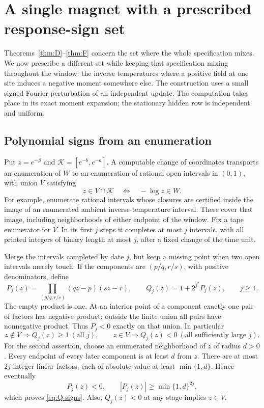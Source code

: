 \section{A single magnet with a prescribed response-sign set}\label{sec:response}

Theorems~\ref{thm:D}--\ref{thm:F} concern the set where the whole specification mixes. We now prescribe a different set while keeping that specification mixing throughout the window: the inverse temperatures where a positive field at one site induces a negative moment somewhere else. The construction uses a small signed Fourier perturbation of an independent update. The computation takes place in its exact moment expansion; the stationary hidden row is independent and uniform.

\subsection{Polynomial signs from an enumeration}\label{sec:sign-polynomials}

Put \(z=e^{-\beta}\) and \(\mathcal K=[e^{-b},e^{-a}]\). A computable change of coordinates transports an enumeration of \(W\) to an enumeration of rational open intervals in \((0,1)\), with union \(V\) satisfying
\[
 z\in V\cap\mathcal K\quad\Longleftrightarrow\quad -\log z\in W.
\]
For example, enumerate rational intervals whose closures are certified inside the image of an enumerated ambient inverse-temperature interval. These cover that image, including neighborhoods of either endpoint of the window. Fix a tape enumerator for \(V\). In its first \(j\) steps it completes at most \(j\) intervals, with all printed integers of binary length at most \(j\), after a fixed change of the time unit.

Merge the intervals completed by date \(j\), but keep a missing point when two open intervals merely touch. If the components are \((p/q,r/s)\), with positive denominators, define
\begin{equation}\label{eq:PQ}
 P_j(z)=\prod_{(p/q,r/s)}(qz-p)(sz-r),\qquad
 Q_j(z)=1+2^{j^2}P_j(z),\qquad j\ge1.
\end{equation}
The empty product is one. At an interior point of a component exactly one pair of factors has negative product; outside the finite union all pairs have nonnegative product. Thus \(P_j<0\) exactly on that union. In particular
\begin{equation}\label{eq:Q-signs}
 z\notin V\Rightarrow Q_j(z)\ge1\ (\text{all }j),\qquad
 z\in V\Rightarrow Q_j(z)<0\ (\text{all sufficiently large }j).
\end{equation}
For the second assertion, choose an enumerated neighborhood of \(z\) of radius \(d>0\). Every endpoint of every later component is at least \(d\) from \(z\). There are at most \(2j\) integer linear factors, each of absolute value at least \(\min\{1,d\}\). Hence eventually
\[
 P_j(z)<0,\qquad |P_j(z)|\ge\min\{1,d\}^{2j},
\]
which proves \eqref{eq:Q-signs}. Also, \(Q_j(z)<0\) at any stage implies \(z\in V\).

